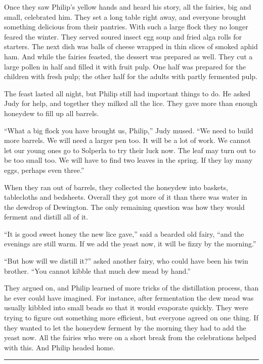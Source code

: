 \documentclass[10pt]{memoir}
\renewcommand{\pfbreakdisplay}{\bigskip \ding{166} \bigskip}
\newcommand{\secbreak}{\fancybreak{\pfbreakdisplay}}
\begin{document}
Once they saw Philip's yellow hands and heard his story, all the fairies, big
and small, celebrated him. They set a long table right away, and everyone
brought something delicious from their pantries. With such a large flock they
no longer feared the winter. They served soured insect egg soup and fried alga
rolls for starters. The next dish was balls of cheese wrapped in thin slices of
smoked aphid ham. And while the fairies feasted, the dessert was prepared as
well. They cut a large pollen in half and filled it with fruit pulp. One half
was prepared for the children with fresh pulp; the other half for the adults
with partly fermented pulp.

The feast lasted all night, but Philip still had important things to do. He
asked Judy for help, and together they milked all the lice. They gave more than
enough honeydew to fill up all barrels.

``What a big flock you have brought us, Philip,'' Judy mused. ``We need to
build more barrels. We will need a larger pen too. It will be a lot of work. We
cannot let our young ones go to Solperla to try their luck now. The leaf may
turn out to be too small too. We will have to find two leaves in the spring. If
they lay many eggs, perhaps even three.''

When they ran out of barrels, they collected the honeydew into baskets,
tablecloths and bedsheets. Overall they got more of it than there was water in
the dewdrop of Dewington. The only remaining question was how they would
ferment and distill all of it.

``It is good sweet honey the new lice gave,'' said a bearded old fairy, ``and
the evenings are still warm. If we add the yeast now, it will be fizzy by the
morning.''

``But how will we distill it?'' asked another fairy, who could have been his
twin brother. ``You cannot kibble that much dew mead by hand.''

They argued on, and Philip learned of more tricks of the distillation process,
than he ever could have imagined. For instance, after fermentation the dew mead
was usually kibbled into small beads so that it would evaporate quickly. They
were trying to figure out something more efficient, but everyone agreed on one
thing. If they wanted to let the honeydew ferment by the morning they had to
add the yeast now. All the fairies who were on a short break from the
celebrations helped with this. And Philip headed home.

\secbreak
\end{document}
